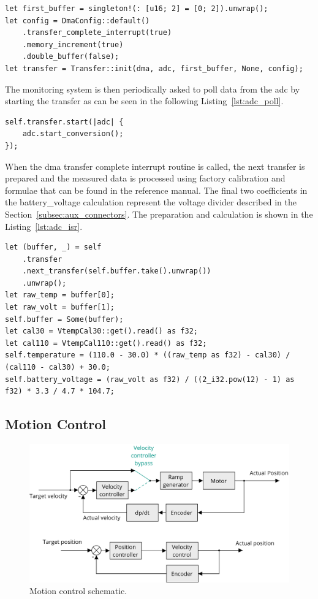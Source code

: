 \begin{lstlisting}[caption={Configuration of the DMA controller for ADC transfers.},label=lst:dma]
let first_buffer = singleton!(: [u16; 2] = [0; 2]).unwrap();
let config = DmaConfig::default()
    .transfer_complete_interrupt(true)
    .memory_increment(true)
    .double_buffer(false);
let transfer = Transfer::init(dma, adc, first_buffer, None, config);
\end{lstlisting}

The monitoring system is then periodically asked to poll data from the \acs{adc} by starting the transfer as can be seen in the following Listing~\ref{lst:adc_poll}.
\begin{lstlisting}[caption={Polling the ADC.},label=lst:adc_poll]
self.transfer.start(|adc| {
    adc.start_conversion();
});
\end{lstlisting}
When the \acs{dma} transfer complete interrupt routine is called, the next transfer is prepared and the measured data is processed using factory calibration and formulae that can be found in the reference manual\cite{stmicro_stm32f405xx_2020}.
The final two coefficients in the battery\_voltage calculation represent the voltage divider described in the Section~\ref{subsec:aux_connectors}.
The preparation and calculation is shown in the Listing~\ref{lst:adc_isr}.
\begin{lstlisting}[caption={Processing the data measured by the ADC.},label=lst:adc_isr]
let (buffer, _) = self
    .transfer
    .next_transfer(self.buffer.take().unwrap())
    .unwrap();
let raw_temp = buffer[0];
let raw_volt = buffer[1];
self.buffer = Some(buffer);
let cal30 = VtempCal30::get().read() as f32;
let cal110 = VtempCal110::get().read() as f32;
self.temperature = (110.0 - 30.0) * ((raw_temp as f32) - cal30) / (cal110 - cal30) + 30.0;
self.battery_voltage = (raw_volt as f32) / ((2_i32.pow(12) - 1) as f32) * 3.3 / 4.7 * 104.7;
\end{lstlisting}

\subsection{Motion Control}
\label{subsec:motion_control}

\begin{figure}[H]
    \centering
    \includegraphics[width=\textwidth]{obrazky/motion_control}
    \caption{Motion control schematic.}
    \label{fig:motion_control}
\end{figure}
